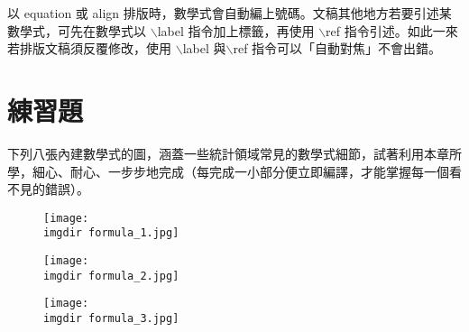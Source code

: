 以 {\A equation} 或 {\A align} 排版時，數學式會自動編上號碼。文稿其他地方若要引述某數學式，可先在數學式以 $\backslash${\A label} 指令加上標籤，再使用 $\backslash${\A ref} 指令引述。如此一來若排版文稿須反覆修改，使用 $\backslash${\A label} 與$\backslash${\A ref} 指令可以「自動對焦」不會出錯。

\section{練習題}
下列八張內建數學式的圖，涵蓋一些統計領域常見的數學式細節，試著利用本章所學，細心、耐心、一步步地完成（每完成一小部分便立即編譯，才能掌握每一個看不見的錯誤）。


\begin{figure}[h]
    \centering
        \texttt{[image: \\imgdir formula\_1.jpg]}
\end{figure}

\begin{figure}[h]
    \centering
        \texttt{[image: \\imgdir formula\_2.jpg]}
\end{figure}

\begin{figure}[h]
    \centering
        \texttt{[image: \\imgdir formula\_3.jpg]}
\end{figure}


